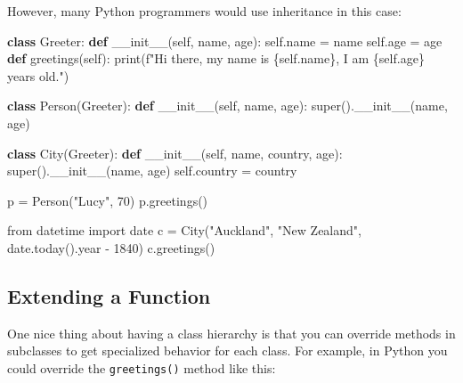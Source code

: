 \documentclass[11pt]{article}
\newenvironment{Shaded}{}{}
\newcommand{\KeywordTok}[1]{\textcolor[rgb]{0.00,0.44,0.13}{\textbf{{#1}}}}
\newcommand{\DecValTok}[1]{\textcolor[rgb]{0.25,0.63,0.44}{{#1}}}
\newcommand{\StringTok}[1]{\textcolor[rgb]{0.25,0.44,0.63}{{#1}}}
\newcommand{\FunctionTok}[1]{\textcolor[rgb]{0.02,0.16,0.49}{{#1}}}
\newcommand{\NormalTok}[1]{{#1}}
\newcommand{\SpecialCharTok}[1]{\textcolor[rgb]{0.25,0.44,0.63}{{#1}}}
\newcommand{\SpecialStringTok}[1]{\textcolor[rgb]{0.73,0.40,0.53}{{#1}}}
\newcommand{\ImportTok}[1]{{#1}}
\newcommand{\VariableTok}[1]{\textcolor[rgb]{0.10,0.09,0.49}{{#1}}}
\newcommand{\OperatorTok}[1]{\textcolor[rgb]{0.40,0.40,0.40}{{#1}}}
\newcommand{\BuiltInTok}[1]{{#1}}
\begin{document}
    However, many Python programmers would use inheritance in this case:

\begin{Shaded}
\begin{Highlighting}[]
\KeywordTok{class}\NormalTok{ Greeter:}
    \KeywordTok{def} \FunctionTok{\_\_init\_\_}\NormalTok{(}\VariableTok{self}\NormalTok{, name, age):}
        \VariableTok{self}\NormalTok{.name }\OperatorTok{=}\NormalTok{ name}
        \VariableTok{self}\NormalTok{.age }\OperatorTok{=}\NormalTok{ age}
    \KeywordTok{def}\NormalTok{ greetings(}\VariableTok{self}\NormalTok{):}
        \BuiltInTok{print}\NormalTok{(}\SpecialStringTok{f"Hi there, my name is }\SpecialCharTok{\{}\VariableTok{self}\SpecialCharTok{.}\NormalTok{name}\SpecialCharTok{\}}\SpecialStringTok{, I am }\SpecialCharTok{\{}\VariableTok{self}\SpecialCharTok{.}\NormalTok{age}\SpecialCharTok{\}}\SpecialStringTok{ years old."}\NormalTok{)}

\KeywordTok{class}\NormalTok{ Person(Greeter):}
    \KeywordTok{def} \FunctionTok{\_\_init\_\_}\NormalTok{(}\VariableTok{self}\NormalTok{, name, age):}
        \BuiltInTok{super}\NormalTok{().}\FunctionTok{\_\_init\_\_}\NormalTok{(name, age)}

\KeywordTok{class}\NormalTok{ City(Greeter):}
    \KeywordTok{def} \FunctionTok{\_\_init\_\_}\NormalTok{(}\VariableTok{self}\NormalTok{, name, country, age):}
        \BuiltInTok{super}\NormalTok{().}\FunctionTok{\_\_init\_\_}\NormalTok{(name, age)}
        \VariableTok{self}\NormalTok{.country }\OperatorTok{=}\NormalTok{ country}

\NormalTok{p }\OperatorTok{=}\NormalTok{ Person(}\StringTok{"Lucy"}\NormalTok{, }\DecValTok{70}\NormalTok{)}
\NormalTok{p.greetings()}

\ImportTok{from}\NormalTok{ datetime }\ImportTok{import}\NormalTok{ date}
\NormalTok{c }\OperatorTok{=}\NormalTok{ City(}\StringTok{"Auckland"}\NormalTok{, }\StringTok{"New Zealand"}\NormalTok{, date.today().year }\OperatorTok{{-}} \DecValTok{1840}\NormalTok{)}
\NormalTok{c.greetings()}
\end{Highlighting}
\end{Shaded}

    \hypertarget{extending-a-function}{%
\subsection{Extending a Function}\label{extending-a-function}}

One nice thing about having a class hierarchy is that you can override
methods in subclasses to get specialized behavior for each class. For
example, in Python you could override the \texttt{greetings()} method
like this:
\end{document}
